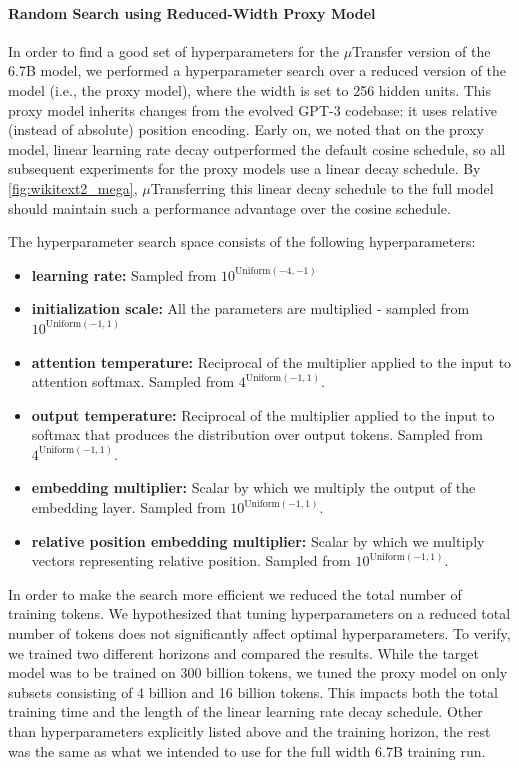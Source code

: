 \documentclass{article}
\theoremstyle{definition}
\begin{document}
\paragraph{Random Search using Reduced-Width Proxy Model}
In order to find a good set of hyperparameters for the $\mu$Transfer version of the 6.7B model, we performed a hyperparameter search over a reduced version of the model (i.e., the proxy model), where the width is set to 256 hidden units.
This proxy model inherits changes from the evolved GPT-3 codebase: it uses relative~\citep{dai2019transformerxl} (instead of absolute) position encoding.
Early on, we noted that on the proxy model, linear learning rate decay outperformed the default cosine schedule, so all subsequent experiments for the proxy models use a linear decay schedule.
By \cref{fig:wikitext2_mega}, $\mu$Transferring this linear decay schedule to the full model should maintain such a performance advantage over the cosine schedule.

The hyperparameter search space consists of the following hyperparameters:

\begin{itemize}
    \item \textbf{learning rate:} Sampled from $10^{\text{Uniform}(-4, -1)}$
    \item \textbf{initialization scale:} All the parameters are multiplied - sampled from $10^{\text{Uniform}(-1, 1)}$
    \item \textbf{attention temperature:} Reciprocal of the multiplier applied to the input to attention softmax. Sampled from $4^{\text{Uniform}(-1, 1)}$.
    \item \textbf{output temperature:} Reciprocal of the multiplier applied to the input to softmax that produces the distribution over output tokens. Sampled from $4^{\text{Uniform}(-1, 1)}$.
    \item \textbf{embedding multiplier:} Scalar by which we multiply the output of the embedding layer. Sampled from $10^{\text{Uniform}(-1, 1)}$.
    \item \textbf{relative position embedding multiplier:} Scalar by which we multiply vectors representing relative position. Sampled from $10^{\text{Uniform}(-1, 1)}$.
\end{itemize}

In order to make the search more efficient we reduced the total number of training tokens.
We hypothesized that tuning hyperparameters on a reduced total number of tokens does not significantly affect optimal hyperparameters.
To verify, we trained two different horizons and compared the results.
While the target model was to be trained on 300 billion tokens, we tuned the proxy model on only subsets consisting of 4 billion and 16 billion tokens.
This impacts both the total training time and the length of the linear learning rate decay schedule.
Other than hyperparameters explicitly listed above and the training horizon, the rest was the same as what we intended to use for the full width 6.7B training run.
\end{document}
